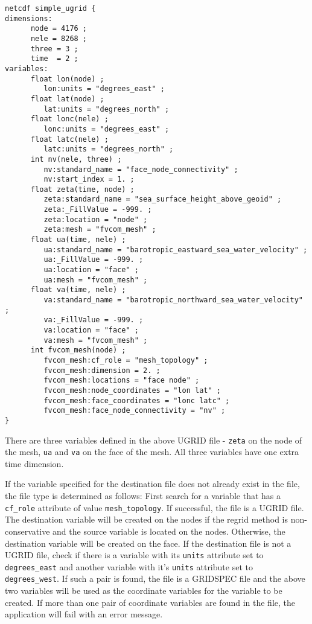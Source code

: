 \label{ugridexample}
\begin{verbatim}
netcdf simple_ugrid {
dimensions:
      node = 4176 ; 
      nele = 8268 ;
      three = 3 ;
      time  = 2 ;
variables:
      float lon(node) ;
         lon:units = "degrees_east" ;
      float lat(node) ;
         lat:units = "degrees_north" ;
      float lonc(nele) ;
         lonc:units = "degrees_east" ;
      float latc(nele) ;
         latc:units = "degrees_north" ;
      int nv(nele, three) ;
         nv:standard_name = "face_node_connectivity" ;
         nv:start_index = 1. ;
      float zeta(time, node) ;
         zeta:standard_name = "sea_surface_height_above_geoid" ;
         zeta:_FillValue = -999. ;
         zeta:location = "node" ;
         zeta:mesh = "fvcom_mesh" ;
      float ua(time, nele) ;
         ua:standard_name = "barotropic_eastward_sea_water_velocity" ;
         ua:_FillValue = -999. ;
         ua:location = "face" ;
         ua:mesh = "fvcom_mesh" ;
      float va(time, nele) ;
         va:standard_name = "barotropic_northward_sea_water_velocity" ;
         va:_FillValue = -999. ;
         va:location = "face" ;
         va:mesh = "fvcom_mesh" ;
      int fvcom_mesh(node) ;
         fvcom_mesh:cf_role = "mesh_topology" ;
         fvcom_mesh:dimension = 2. ;
         fvcom_mesh:locations = "face node" ;
         fvcom_mesh:node_coordinates = "lon lat" ;
         fvcom_mesh:face_coordinates = "lonc latc" ;
         fvcom_mesh:face_node_connectivity = "nv" ;
}
\end{verbatim}

There are three variables defined in the above UGRID file - {\tt zeta} on the node of the mesh, {\tt ua} and
{\tt va} on the face of the mesh.  All three variables have one extra time dimension.  

If the variable specified for the destination file does not already exist in the file, the file type is determined as follows:  
First search for a variable that has a {\tt cf\_role} attribute of value {\tt mesh\_topology}.  If successful,
the file is a UGRID file.  The destination variable will be created on the nodes if the regrid method is 
non-conservative and the source variable is located on the nodes.  Otherwise, the destination variable will be created
on the face.  If the destination file is not a UGRID file, check if there is a variable with its {\tt units} attribute set to {\tt degrees\_east} and another variable with it's {\tt units} attribute set to {\tt degrees\_west}.  If such a pair is found, 
the file is a GRIDSPEC file and the above two variables will be used as the coordinate variables for the 
variable to be created.  If more than one pair of coordinate variables are found in the file, the application 
will fail with an error message.  

